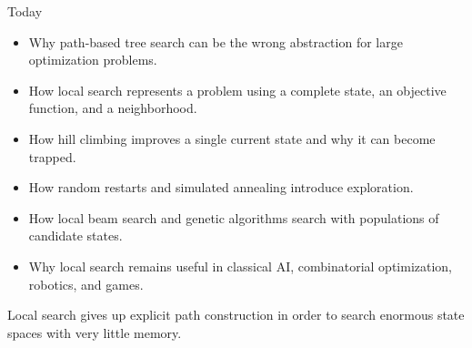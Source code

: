 \documentclass[aspectratio=169,10pt]{beamer}
\begin{document}
\makedecktitle

\begin{frame}[shrink=20]{Today}
  \begin{itemize}
    \item Why path-based tree search can be the wrong abstraction for large optimization problems.
    \item How local search represents a problem using a complete state, an objective function, and a neighborhood.
    \item How hill climbing improves a single current state and why it can become trapped.
    \item How random restarts and simulated annealing introduce exploration.
    \item How local beam search and genetic algorithms search with populations of candidate states.
    \item Why local search remains useful in classical AI, combinatorial optimization, robotics, and games.
  \end{itemize}

  \begin{keyidea}
    Local search gives up explicit path construction in order to search enormous state spaces with very little memory.
  \end{keyidea}
\end{frame}

\end{document}
